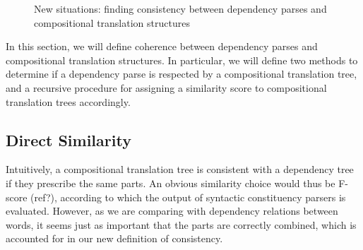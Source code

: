 \documentclass{report}
\theoremstyle{definition}
\theoremstyle{plain}
\begin{document}
\begin{figure}[!ht]
\centering
{}
\caption{New situations: finding consistency between dependency parses and compositional translation structures}\label{fig:depshats}
\end{figure}

\noindent In this section, we will define coherence between dependency parses and compositional translation structures. In particular, we will define two methods to determine if a dependency parse is respected by a compositional translation tree,  and a recursive procedure for assigning a similarity score to compositional translation trees accordingly. 

\subsection{Direct Similarity}

Intuitively, a compositional translation tree is consistent with a dependency tree if they prescribe the same parts. An obvious similarity choice would thus be F-score (ref?), according to which the output of syntactic constituency parsers is evaluated. However, as we are comparing with dependency relations between words, it seems just as important that the parts are correctly combined, which is accounted for in our new definition of consistency. 
\end{document}
